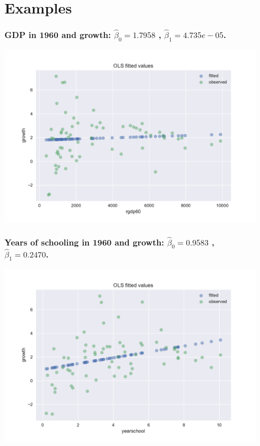 \section{Examples}
\begin{frame}\frametitle{GDP in 1960 and growth: $\hat{\beta}_0 = 1.7958$ ,
    $\hat{\beta}_1 = 4.735e-05$. }

  \includegraphics[width=\figwidth,height=\figheight]{lreg_GrowthGDP}   

\end{frame}

\begin{frame}\frametitle{Years of schooling in 1960 and growth: $\hat{\beta}_0 =  0.9583$ ,
    $\hat{\beta}_1 = 0.2470$.}

  \includegraphics[width=\figwidth,height=\figheight]{lreg_GrowthSchool}   

\end{frame}

